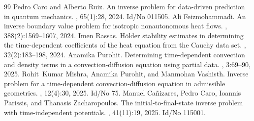\documentclass[10pt,a4paper]{amsart}
\begin{document}
\begin{thebibliography}{99}
 Pedro Caro and Alberto Ruiz. \newblock An inverse problem for data-driven prediction in quantum mechanics. , 65(1):28, 2024. \newblock Id/No 011505.
 Ali Feizmohammadi. \newblock An inverse boundary value problem for isotropic nonautonomous heat flows. , 388(2):1569--1607, 2024.
 Imen Rassas. \newblock H{\"o}lder stability estimates in determining the time-dependent coefficients of the heat equation from the {Cauchy} data set. , 32(2):183--198, 2024.
 Anamika Purohit. \newblock Determining time-dependent convection and density terms in a convection-diffusion equation using partial data. , 3:69--90, 2025.
 Rohit~Kumar Mishra, Anamika Purohit, and Manmohan Vashisth. \newblock Inverse problem for a time-dependent convection-diffusion equation in admissible geometries. , 12(4):30, 2025. \newblock Id/No 75.
 Manuel Ca{\~n}izares, Pedro Caro, Ioannis Parissis, and Thanasis Zacharopoulos. \newblock The initial-to-final-state inverse problem with time-independent potentials. , 41(11):19, 2025. \newblock Id/No 115001.
\end{thebibliography}
\end{document}
